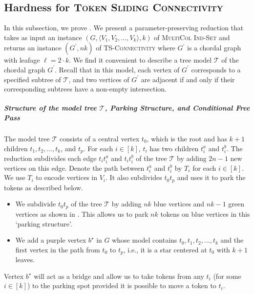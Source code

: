 \subsection{Hardness for \textsc{Token Sliding Connectivity}}

In this subsection, we prove .
We present a parameter-preserving reduction that takes as input an 
instance $(G,\langle V_1,V_2,\ldots,V_k\rangle, k)$ of 
\textsc{MultiCol Ind-Set} and returns an instance 
$(G^\prime,nk)$ of \textsc{TS-Connectivity} 
where $G^\prime$ is a chordal graph with leafage $\ell = 2 \cdot k$. 
We find it convenient to describe a tree model $\mathcal{T}$ of the 
chordal graph $G^\prime$.
Recall that in this model,
each vertex of $G^\prime$ corresponds to a specified subtree of 
$\mathcal{T}$, and two vertices of $G^\prime$ are adjacent 
if and only if their corresponding subtrees have a non-empty intersection.

\subparagraph*{Structure of the model tree $\mathcal{T}$, Parking Structure, and Conditional Free Pass }

The model tree $\mathcal{T}$ consists of a central vertex $t_0$, which is the root and has $k+1$ children $t_1,t_2,\ldots,t_k$, and $t_p$.
For each $i\in[k]$, $t_i$ has two children $t_i^a$ and $t_i^b$.
The reduction subdivides each edge $t_i t_i^a$ and $t_i t_i^b$ of the tree $\mathcal{T}$ by adding $2n-1$ new vertices on this edge.
Denote the path between {$t_i^a$} and $t_i^b$ by $T_i$ for each $i \in [k]$.
We use $T_i$ to encode vertices in $V_i$.
It also subdivides $t_0 t_p$ and uses it to park the tokens as
described below.
\begin{itemize}
\item {We subdivide $t_0t_p$ of the tree $\mathcal{T}$ by adding} $nk$ blue vertices and $nk-1$
green vertices as shown in .
This allows us to park $nk$ tokens on blue vertices in this `parking structure'.
\item We add a purple vertex $b^\star$ in $G$ whose model contains
${t_0,t_1,t_2,\ldots,t_k}$ and the first vertex in the path from
$t_0$ to $t_p$, i.e., it is a star centered at $t_0$ with $k + 1$ leaves.
\end{itemize}
Vertex $b^{\star}$ will act as a bridge and allow us to take
tokens from any $t_i$ (for some $i\in [k]$) to the parking spot
provided it is possible to move a token to $t_i$.

